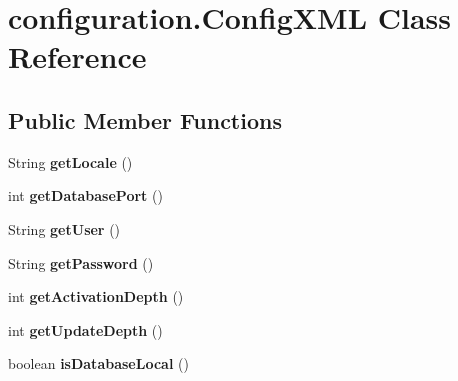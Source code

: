 \hypertarget{classconfiguration_1_1_config_x_m_l}{}\section{configuration.\+Config\+X\+ML Class Reference}
\label{classconfiguration_1_1_config_x_m_l}
\subsection*{Public Member Functions}
\begin{DoxyCompactItemize}
\item 
\mbox{\label{classconfiguration_1_1_config_x_m_l_a6b861b18eba822ef3a5130a1c3f410b2}} 
String {\bfseries get\+Locale} ()
\item 
\mbox{\label{classconfiguration_1_1_config_x_m_l_abf4649caafdcfb0b506af7402f09728c}} 
int {\bfseries get\+Database\+Port} ()
\item 
\mbox{\label{classconfiguration_1_1_config_x_m_l_a98e53bd841ca5f520af914f96ff2afef}} 
String {\bfseries get\+User} ()
\item 
\mbox{\label{classconfiguration_1_1_config_x_m_l_a70146fb5f8cda65220413959691e3616}} 
String {\bfseries get\+Password} ()
\item 
\mbox{\label{classconfiguration_1_1_config_x_m_l_afa4f081029d29faec64f93506dd5ee34}} 
int {\bfseries get\+Activation\+Depth} ()
\item 
\mbox{\label{classconfiguration_1_1_config_x_m_l_a3c684aaee496a9aee2f57dcba57c70bf}} 
int {\bfseries get\+Update\+Depth} ()
\item 
\mbox{\label{classconfiguration_1_1_config_x_m_l_a2ee9afbde36aa3f5c0d0158a8b5449fb}} 
boolean {\bfseries is\+Database\+Local} ()
\item 
\mbox{\label{classconfiguration_1_1_config_x_m_l_a3055cd4f61151ef6d1c48a5ebf86b33f}} 

\end{DoxyCompactItemize}
